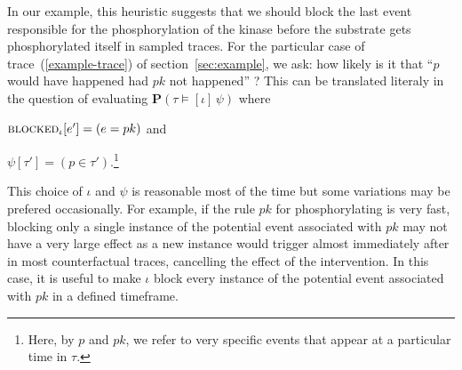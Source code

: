 In our example, this heuristic suggests that we should
block the last event responsible for the phosphorylation of the kinase
before the substrate gets phosphorylated itself in sampled traces. For
the particular case of trace~(\ref{example-trace}) of
section~\ref{sec:example}, we ask: how likely is it that ``$p$ would
have happened had $pk$ not happened'' ?  This can be translated
literaly in the question of evaluating
$\mathbf{P}(\tau \!\models\! [\iota] \, \psi)$ where
\begin{inparaenum}[(i)]
\item ${\textsc{blocked}}_{\iota}[e'] = (e = pk)$ and
\item $\psi[\tau'] = (p \in \tau')$.\footnote{Here, by $p$ and $pk$,
    we refer to very specific events that appear at a particular time
    in $\tau$.}
\end{inparaenum}
This choice of $\iota$ and $\psi$ is reasonable most of the
time but some variations may be prefered occasionally. For example, if
the rule $pk$ for phosphorylating is very fast, blocking only a single
instance of the potential event associated with $pk$ may not have a
very large effect as a new instance would trigger almost immediately
after in most counterfactual traces, cancelling the effect of the
intervention.  In this case, it is useful to make $\iota$ block every
instance of the potential event associated with $pk$ in a defined
timeframe.


